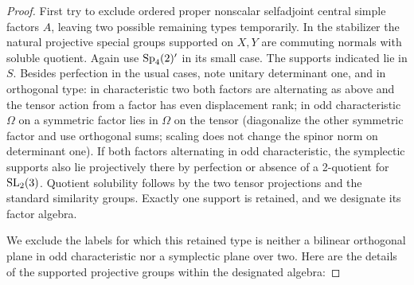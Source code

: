 \begin{proof}
First try to exclude ordered proper nonscalar selfadjoint central simple factors \(A\), leaving two possible remaining types temporarily. In the stabilizer the natural projective special groups supported on \(X,Y\) are commuting normals with soluble quotient. Again use \({\rm Sp}_4(2)'\) in its small case. The supports indicated lie in \(S\). Besides perfection in the usual cases, note unitary determinant one, and in orthogonal type: in characteristic two both factors are alternating as above and the tensor action from a factor has even displacement rank; in odd characteristic \(\Omega\) on a symmetric factor lies in \(\Omega\) on the tensor (diagonalize the other symmetric factor and use orthogonal sums; scaling does not change the spinor norm on determinant one). If both factors alternating in odd characteristic, the symplectic supports also lie projectively there by perfection or absence of a 2-quotient for \({\rm SL}_2(3)\). Quotient solubility follows by the two tensor projections and the standard similarity groups. Exactly one support is retained, and we designate its factor algebra.

We exclude the labels for which this retained type is neither a bilinear orthogonal plane in odd characteristic nor a symplectic plane over two. Here are the details of the supported projective groups within the designated algebra:


\end{proof}
